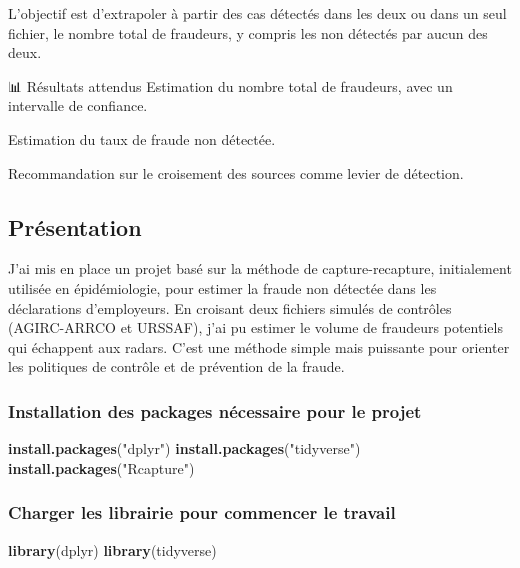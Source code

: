 \documentclass[
]{article}
\newenvironment{Shaded}{\begin{snugshade}}{\end{snugshade}}
\newcommand{\FunctionTok}[1]{\textcolor[rgb]{0.13,0.29,0.53}{\textbf{#1}}}
\newcommand{\NormalTok}[1]{#1}
\newcommand{\StringTok}[1]{\textcolor[rgb]{0.31,0.60,0.02}{#1}}
\begin{document}
L'objectif est d'extrapoler à partir des cas détectés dans les deux ou
dans un seul fichier, le nombre total de fraudeurs, y compris les non
détectés par aucun des deux.

📊 Résultats attendus Estimation du nombre total de fraudeurs, avec un
intervalle de confiance.

Estimation du taux de fraude non détectée.

Recommandation sur le croisement des sources comme levier de détection.

\subsection{Présentation}\label{pruxe9sentation}

J'ai mis en place un projet basé sur la méthode de capture-recapture,
initialement utilisée en épidémiologie, pour estimer la fraude non
détectée dans les déclarations d'employeurs. En croisant deux fichiers
simulés de contrôles (AGIRC-ARRCO et URSSAF), j'ai pu estimer le volume
de fraudeurs potentiels qui échappent aux radars. C'est une méthode
simple mais puissante pour orienter les politiques de contrôle et de
prévention de la fraude.

\subsubsection{Installation des packages nécessaire pour le
projet}\label{installation-des-packages-nuxe9cessaire-pour-le-projet}

\begin{Shaded}
\begin{Highlighting}[]
\FunctionTok{install.packages}\NormalTok{(}\StringTok{"dplyr"}\NormalTok{)}
\FunctionTok{install.packages}\NormalTok{(}\StringTok{"tidyverse"}\NormalTok{)}
\FunctionTok{install.packages}\NormalTok{(}\StringTok{"Rcapture"}\NormalTok{)}
\end{Highlighting}
\end{Shaded}

\subsubsection{Charger les librairie pour commencer le
travail}\label{charger-les-librairie-pour-commencer-le-travail}

\begin{Shaded}
\begin{Highlighting}[]
\FunctionTok{library}\NormalTok{(dplyr)}
\FunctionTok{library}\NormalTok{(tidyverse)}
\end{Highlighting}
\end{Shaded}
\end{document}

